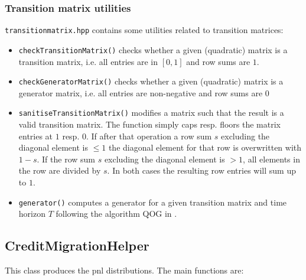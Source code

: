 \documentclass[12pt, a4paper]{article}
\begin{document}
\subsubsection{Transition matrix utilities}

\verb+transitionmatrix.hpp+ contains some utilities related to transition matrices:

\begin{itemize}
\item \verb+checkTransitionMatrix()+ checks whether a given (quadratic) matrix is a transition matrix, i.e. all entries are in $[0,1]$ and row sums are $1$.
\item \verb+checkGeneratorMatrix()+ checks whether a given (quadratic) matrix is a generator matrix, i.e. all entries
  are non-negative and row sums are $0$
\item \verb+sanitiseTransitionMatrix()+ modifies a matrix such that the result is a valid transition matrix. The function simply caps resp. floors the matrix entries at $1$ resp. $0$. If after that
  operation a row sum $s$ excluding the diagonal element is $\leq 1$ the diagonal element for that row is overwritten
  with $1-s$. If the row sum $s$ excluding the diagonal element is $>1$, all elements in the row are divided by $s$. In
  both cases the resulting row entries will sum up to $1$.
\item \verb+generator()+ computes a generator for a given transition matrix and time horizon $T$ following the algorithm
  QOG in \cite{Kreinin2001}.
\end{itemize}

\subsection{CreditMigrationHelper}

This class produces the pnl distributions. The main functions are:
\end{document}
